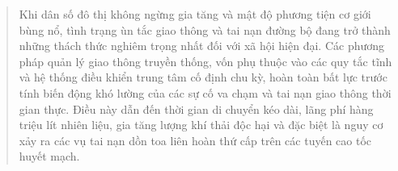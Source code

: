 \documentclass[a4paper]{article}
\begin{document}
\clearpage

\setcounter{page}{1}

\begin{abstract}
\noindent Khi dân số đô thị không ngừng gia tăng và mật độ phương tiện cơ giới bùng nổ, tình trạng ùn tắc giao thông và tai nạn đường bộ đang trở thành những thách thức nghiêm trọng nhất đối với xã hội hiện đại. Các phương pháp quản lý giao thông truyền thống, vốn phụ thuộc vào các quy tắc tĩnh và hệ thống điều khiển trung tâm cố định chu kỳ, hoàn toàn bất lực trước tính biến động khó lường của các sự cố va chạm và tai nạn giao thông thời gian thực. Điều này dẫn đến thời gian di chuyển kéo dài, lãng phí hàng triệu lít nhiên liệu, gia tăng lượng khí thải độc hại và đặc biệt là nguy cơ xảy ra các vụ tai nạn dồn toa liên hoàn thứ cấp trên các tuyến cao tốc huyết mạch.


\end{abstract}
\end{document}
